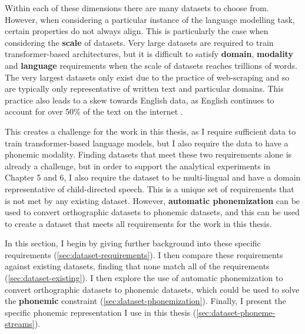 Within each of these dimensions there are many datasets to choose from. However, when considering a particular instance of the language modelling task, certain properties do not always align. This is particularly the case when considering the \textbf{scale} of datasets. Very large datasets are required to train transformer-based architectures, but it is difficult to satisfy \textbf{domain}, \textbf{modality} and \textbf{language} requirements when the scale of datasets reaches trillions of words. The very largest datasets only exist due to the practice of web-scraping \citep{bansal-2022-datascaling} and so are typically only representative of written text and particular domains. This practice also leads to a skew towards English data, as English continues to account for over 50\% of the text on the internet \citep{ebbertz2002, danet2007multilingual, DataReportal2024}.

This creates a challenge for the work in this thesis, as I require sufficient data to train transformer-based language models, but I also require the data to have a phonemic modality. Finding datasets that meet these two requirements alone is already a challenge, but in order to support the analytical experiments in Chapter 5 and 6, I also require the dataset to be multi-lingual and have a domain representative of child-directed speech. This is a unique set of requirements that is not met by any existing dataset. However, \textbf{automatic phonemization} can be used to convert orthographic datasets to phonemic datasets, and this can be used to create a dataset that meets all requirements for the work in this thesis.

In this section, I begin by giving further background into these specific requirements (\cref{sec:dataset-requirements}). I then compare these requirements against existing datasets, finding that none match all of the requirements (\cref{sec:dataset-existing}). I then explore the use of automatic phonemization to convert orthographic datasets to phonemic datasets, which could be used to solve the \textbf{phonemic} constraint (\cref{sec:dataset-phonemization}). Finally, I present the specific phonemic representation I use in this thesis (\cref{sec:dataset-phoneme-streams}).

